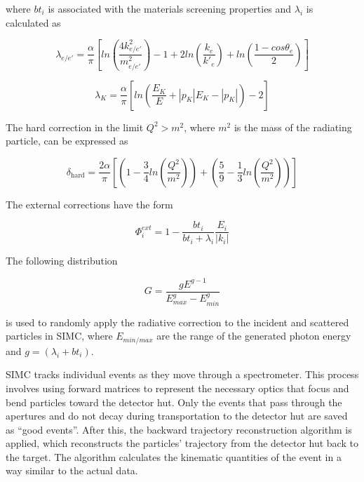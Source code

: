 \documentclass[
]{report}
\begin{document}
\noindent where \(bt_i\) is associated with the materials screening
properties and \(\lambda_i\) is calculated as

\begin{equation} 
  \lambda_{e/e'}=\frac{\alpha}{\pi}[ln(\frac{4k^2_{e/e'}}{m^2_{e/e'}})-1+2ln(\frac{k_e}{k'_e})+ln(\frac{1-cos\theta_e}{2})]
  \label{eq:lambda_e} 
\end{equation}

\begin{equation} 
  \lambda_{K}=\frac{\alpha}{\pi}[ln(\frac{E_K}{E}+\left|p_K\right|E_K-\left|p_K\right|)-2]
  \label{eq:lambda_k} 
\end{equation}

The hard correction in the limit \(Q^2>m^2\), where \(m^2\) is the mass
of the radiating particle, can be expressed as

\begin{equation} 
  \delta_{\text{hard}}=\frac{2\alpha}{\pi}[(1-\frac{3}{4}ln(\frac{Q^2}{m^2}))+(\frac{5}{9}-\frac{1}{3}ln(\frac{Q^2}{m^2}))]
  \label{eq:hard_corr} 
\end{equation}

The external corrections have the form

\begin{equation} 
  \Phi^{ext}_i=1-\frac{bt_i}{bt_i+\lambda_i}\frac{E_i}{\left|k_i\right|}
  \label{eq:ext_corr} 
\end{equation}

The following distribution

\begin{equation} 
  G=\frac{gE^{g-1}}{E^g_{max}-E^g_{min}}
  \label{eq:radiative_corr_distro} 
\end{equation}

\noindent is used to randomly apply the radiative correction to the
incident and scattered particles in SIMC, where \(E_{min/max}\) are the
range of the generated photon energy and \(g=(\lambda_i+bt_i)\).

\label{Chapter-4-6}

SIMC tracks individual events as they move through a spectrometer. This
process involves using forward matrices to represent the necessary
optics that focus and bend particles toward the detector hut. Only the
events that pass through the apertures and do not decay during
transportation to the detector hut are saved as ``good events''. After
this, the backward trajectory reconstruction algorithm is applied, which
reconstructs the particles' trajectory from the detector hut back to the
target. The algorithm calculates the kinematic quantities of the event
in a way similar to the actual data.
\end{document}
